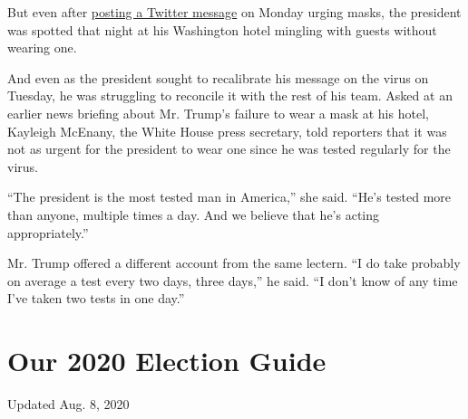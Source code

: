 But even after
\href{https://twitter.com/realDonaldTrump/status/1285299379746811915}{posting
a Twitter message} on Monday urging masks, the president was spotted
that night at his Washington hotel mingling with guests without wearing
one.

And even as the president sought to recalibrate his message on the virus
on Tuesday, he was struggling to reconcile it with the rest of his team.
Asked at an earlier news briefing about Mr. Trump's failure to wear a
mask at his hotel, Kayleigh McEnany, the White House press secretary,
told reporters that it was not as urgent for the president to wear one
since he was tested regularly for the virus.

``The president is the most tested man in America,'' she said. ``He's
tested more than anyone, multiple times a day. And we believe that he's
acting appropriately.''

Mr. Trump offered a different account from the same lectern. ``I do take
probably on average a test every two days, three days,'' he said. ``I
don't know of any time I've taken two tests in one day.''

\hypertarget{our-2020-election-guide}{%
\section{Our 2020 Election Guide}\label{our-2020-election-guide}}

Updated Aug. 8, 2020

